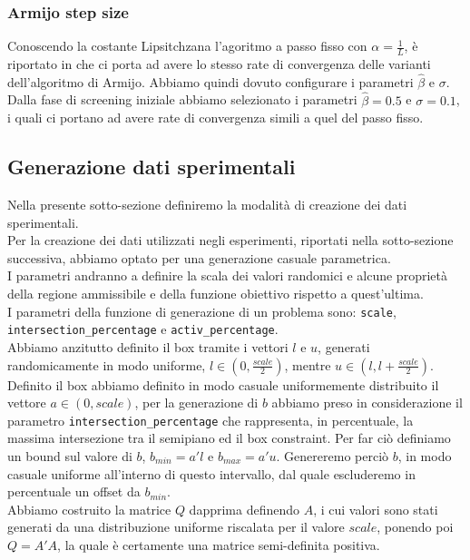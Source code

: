 \documentclass[12pt]{extarticle}
\begin{document}
\subsubsection{Armijo step size}
Conoscendo la costante  Lipsitchzana l'agoritmo a passo fisso con $\alpha = \frac{1}{L}$, è riportato in \cite{gafni1982convergence} che  ci porta ad avere lo stesso rate di convergenza delle varianti dell'algoritmo di Armijo. Abbiamo quindi dovuto configurare i parametri $\hat{\beta}$ e $\sigma$. Dalla fase di screening iniziale abbiamo selezionato i parametri $\hat{\beta}= 0.5$ e $\sigma = 0.1$, i quali ci portano ad avere rate di convergenza simili a quel del passo fisso.
\subsection{Generazione dati sperimentali}
Nella presente sotto-sezione definiremo la modalità di creazione dei dati sperimentali.\\
Per la creazione dei dati utilizzati negli esperimenti, riportati nella sotto-sezione successiva, abbiamo optato per una generazione casuale parametrica.\\
I parametri andranno a definire la scala dei valori randomici e alcune proprietà della regione ammissibile e della funzione obiettivo rispetto a quest'ultima.\\
I parametri della funzione di generazione di un problema sono: \texttt{scale},\\
\texttt{intersection\_percentage} e \texttt{activ\_percentage}.\\
Abbiamo anzitutto definito il box tramite i vettori $l$ e $u$, generati randomicamente in modo uniforme, $l \in  (0, \frac{scale}{2})$, mentre $u \in (l, l + \frac{scale}{2})$.\\
Definito il box abbiamo definito in modo casuale uniformemente distribuito il vettore $a \in (0, scale)$, per la generazione di $b$ abbiamo preso in considerazione il parametro \texttt{intersection\_percentage} che rappresenta, in percentuale, la massima intersezione tra il semipiano ed il box constraint. Per far ciò definiamo un bound sul valore di $b$, $b_{min} = a'l$ e $b_{max} = a'u$. Genereremo perciò $b$, in modo casuale uniforme all'interno di questo intervallo, dal quale escluderemo in percentuale un offset da $b_{min}$.\\
Abbiamo costruito la matrice $Q$ dapprima definendo $A$, i cui valori sono stati generati da una distribuzione uniforme riscalata per il valore $scale$, ponendo poi $Q = A'A$, la quale è certamente una matrice semi-definita positiva.\\
\end{document}
